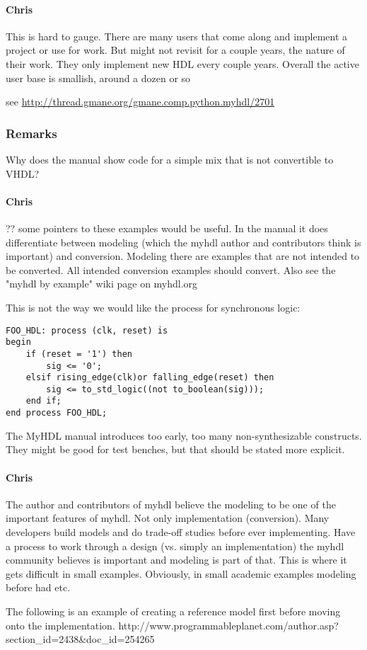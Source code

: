 \documentclass[10pt, technote, draftcls, onecolumn]{IEEEtran}
\newcommand{\comment}[3]{\paragraph*{\textbf{#1}}{\color{#3}#2}}
\newcommand{\cfelton}[1]{\comment{Chris}{#1}{Blue}}
\begin{document}
\cfelton{This is hard to gauge.  There are many users that come along and implement
a project or use for work.  But might not revisit for a couple years, the nature of 
their work.  They only implement new HDL every couple years.  Overall the active
user base is smallish, around a dozen or so}

see \url{http://thread.gmane.org/gmane.comp.python.myhdl/2701}

\subsubsection{Remarks}

Why does the manual show code for a simple mix that is not convertible to VHDL?

\cfelton{?? some pointers to these examples would be useful.  In the manual it
does differentiate between modeling (which the myhdl author and contributors think
is important) and conversion.  Modeling there are examples that are not intended
to be converted.  All intended conversion examples should convert.  Also see the 
"myhdl by example" wiki page on myhdl.org}

This is not the way we would like the process for synchronous logic:

\begin{verbatim}
FOO_HDL: process (clk, reset) is
begin
    if (reset = '1') then
        sig <= '0';
    elsif rising_edge(clk)or falling_edge(reset) then
        sig <= to_std_logic((not to_boolean(sig)));
    end if;
end process FOO_HDL;
\end{verbatim}

The MyHDL manual introduces too early, too many non-synthesizable constructs.
They might be good for test benches, but that should be stated more explicit.

\cfelton{The author and contributors of myhdl believe the modeling to be one
of the important features of myhdl.  Not only implementation (conversion).  Many
developers build models and do trade-off studies before ever implementing.  
Have a process to work through a design (vs. simply an implementation) the 
myhdl community believes is important and modeling is part of that.  This is
where it gets difficult in small examples.  Obviously, in small academic examples
modeling before had etc. 

The following is an example of creating a reference model first before moving
onto the implementation.
http://www.programmableplanet.com/author.asp?section_id=2438&doc_id=254265
}
\end{document}
